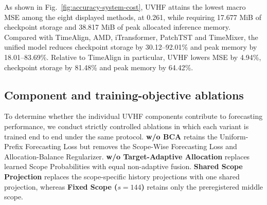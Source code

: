 \documentclass[final,3p,times]{elsarticle}
\newif\ifshowrevisions
\newcommand{\rev}[1]{\ifshowrevisions\textcolor{revisionblue}{#1}\else#1\fi}
\begin{document}
As shown in Fig.~\ref{fig:accuracy-system-cost}, \rev{UVHF} attains the lowest macro MSE among the eight displayed methods, at 0.261, while requiring 17.677 MiB of checkpoint storage and 38.817 MiB of peak allocated inference memory. Compared with TimeAlign, AMD, iTransformer, PatchTST and TimeMixer, the unified model reduces checkpoint storage by 30.12--92.01\% and peak memory by 18.01--83.69\%. Relative to TimeAlign in particular, \rev{UVHF} lowers MSE by 4.94\%, checkpoint storage by 81.48\% and peak memory by 64.42\%.

\subsection{Component and training-objective ablations}
\label{sec:ablation}


To determine whether the individual \rev{UVHF components} contribute to forecasting performance, we conduct strictly controlled ablations in which each variant is trained end to end under the same protocol. \textbf{\rev{w/o BCA}} retains the Uniform-Prefix Forecasting Loss but removes the Scope-Wise Forecasting Loss and Allocation-Balance Regularizer. \textbf{w/o Target-Adaptive Allocation} replaces learned Scope Probabilities with equal non-adaptive fusion. \textbf{Shared Scope Projection} replaces the scope-specific history projections with one shared projection, whereas \textbf{Fixed Scope ($s=144$)} retains only the preregistered middle scope.
\end{document}
